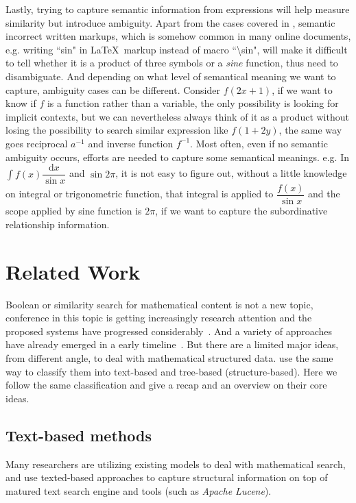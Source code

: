 Lastly, trying to capture semantic information from expressions will help measure similarity but introduce ambiguity. 
Apart from the cases covered in \cite{parsing_tex}, semantic incorrect written markups, which is somehow common in many online documents, e.g. writing ``sin" in \LaTeX\ markup instead of macro ``\textbackslash sin", will make it difficult to tell whether it is a product of three symbols or a \textit{sine} function, thus need to disambiguate. 
And depending on what level of semantical meaning we want to capture, ambiguity cases can be different. 
Consider $f(2x+1)$, if we want to know if $f$ is a function rather than a variable, the only possibility is looking for implicit contexts, but we can nevertheless always think of it as a product without losing the possibility to search similar expression like $f(1 + 2y)$, the same way goes reciprocal $a^{-1}$ and inverse function $f^{-1}$. 
Most often, even if no semantic ambiguity occurs, efforts are needed to capture some semantical meanings. e.g. In $\displaystyle\int f(x) \dfrac{\mathrm{d}x}{\sin x}$ and $\sin 2 \pi$, it is not easy to figure out, without a little knowledge on integral or trigonometric function, that integral is applied to $\dfrac {f(x)} {\sin x}$ and the scope applied by sine function is $2 \pi$, if we want to capture the subordinative relationship information.


\section{Related Work}
Boolean or similarity search for mathematical content is not a new topic, conference in this topic is getting increasingly research attention and the proposed systems have progressed considerably~\cite{ov}. 
And a variety of approaches have already emerged in a early timeline~\cite{egomath13}.
But there are a limited major ideas, from different angle, to deal with mathematical structured data. \cite{WikiMirs13,symbolpairs15,Youssef14} use the same way to classify them into text-based and tree-based (structure-based). Here we follow the same classification and give a recap and an overview on their core ideas.

\subsection{Text-based methods}
Many researchers are utilizing existing models to deal with mathematical search, and use texted-based approaches to capture structural information on top of matured text search engine and tools (such as \textit{Apache Lucene}). 

